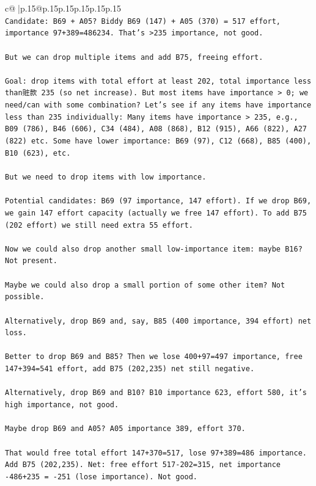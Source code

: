 \documentclass{article}
\begin{document}
{\begin{supertabular}{c@{$\;$}|p{.15\linewidth}@{}p{.15\linewidth}p{.15\linewidth}p{.15\linewidth}p{.15\linewidth}p{.15\linewidth}}
{{{\\ 
\texttt{Candidate: B69 + A05? Biddy B69 (147) + A05 (370) = 517 effort, importance 97+389=486234. That's >235 importance, not good.} \\
\\ 
\texttt{But we can drop multiple items and add B75, freeing effort.} \\
\\ 
\texttt{Goal: drop items with total effort at least 202, total importance less than赃款 235 (so net increase). But most items have importance > 0; we need/can with some combination? Let's see if any items have importance less than 235 individually: Many items have importance > 235, e.g., B09 (786), B46 (606), C34 (484), A08 (868), B12 (915), A66 (822), A27 (822) etc. Some have lower importance: B69 (97), C12 (668), B85 (400), B10 (623), etc.} \\
\\ 
\texttt{But we need to drop items with low importance.} \\
\\ 
\texttt{Potential candidates: B69 (97 importance, 147 effort). If we drop B69, we gain 147 effort capacity (actually we free 147 effort). To add B75 (202 effort) we still need extra 55 effort.} \\
\\ 
\texttt{Now we could also drop another small low{-}importance item: maybe B16? Not present.} \\
\\ 
\texttt{Maybe we could also drop a small portion of some other item? Not possible.} \\
\\ 
\texttt{Alternatively, drop B69 and, say, B85 (400 importance, 394 effort) net loss.} \\
\\ 
\texttt{Better to drop B69 and B85? Then we lose 400+97=497 importance, free 147+394=541 effort, add B75 (202,235) net still negative.} \\
\\ 
\texttt{Alternatively, drop B69 and B10? B10 importance 623, effort 580, it's high importance, not good.} \\
\\ 
\texttt{Maybe drop B69 and A05? A05 importance 389, effort 370.} \\
\\ 
\texttt{That would free total effort 147+370=517, lose 97+389=486 importance. Add B75 (202,235). Net: free effort 517{-}202=315, net importance {-}486+235 = {-}251 (lose importance). Not good.} \\
}}}
\end{supertabular}}
\end{document}
